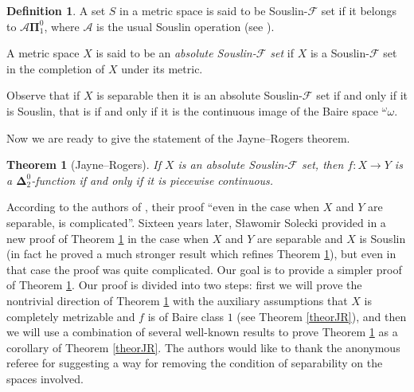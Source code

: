 \documentclass{rae}
\newcommand{\Bai}{\ensuremath{{}^\omega \omega}}
\newcommand{\bPi}{\mathbf{\Pi}}
\newcommand{\bDelta}{\mathbf{\Delta}}
\newtheorem{theorem}{Theorem}[section]
\theoremstyle{definition}
\newtheorem{defin}{Definition}
\begin{document}
\begin{defin}
A set $S$ in a metric space is said to be Souslin-$\mathscr{F}$ set
if it belongs to $\mathcal{A}\bPi^0_1$, where $\mathcal{A}$ is the 
usual Souslin operation (see \cite[Definition 25.4]{kechris}).

A metric space $X$ is said to be an \emph{absolute 
Souslin-$\mathscr{F}$ set} if $X$ is a Souslin-$\mathscr{F}$ set 
in the completion of $X$ under its metric.
\end{defin}

Observe that if $X$ is separable then it is an absolute 
Souslin-$\mathscr{F}$ set if and only if it is Souslin, that
is if and only if it is the continuous image of the Baire space
$\Bai$.

Now we are ready to give the statement of the Jayne--Rogers theorem.

\begin{theorem}[Jayne--Rogers]\label{theorJRoriginal}
If $X$ is an absolute Souslin-$\mathscr{F}$ set, then $f\colon X 
\to Y$ is a $\bDelta^0_2$-function if and only if it is piecewise
 continuous.
\end{theorem}

According to the authors of \cite{jaynerogers}, their proof ``even
 in the case when $X$ and $Y$ are separable, is complicated''. 
Sixteen years later, S{\l}awomir Solecki
 provided in \cite{solecki} a new proof of Theorem \ref{theorJRoriginal}
 in the case when $X$ and $Y$ are separable and $X$ is Souslin 
(in fact he proved a much stronger result which refines Theorem 
\ref{theorJRoriginal}), but even in that case the proof was quite
 complicated. Our goal is to provide a simpler proof of Theorem 
\ref{theorJRoriginal}. Our proof is divided into two steps: first we
will prove the nontrivial direction of Theorem \ref{theorJRoriginal}
with the auxiliary assumptions that $X$ is completely metrizable and
$f$ is of Baire class $1$ (see Theorem \ref{theorJR}), and then we
will use a combination of several well-known results to prove Theorem
\ref{theorJRoriginal} as a corollary of Theorem \ref{theorJR}. The
authors would like to thank the anonymous referee for
suggesting a way for removing the condition of separability on the
spaces involved.\\
\end{document}
